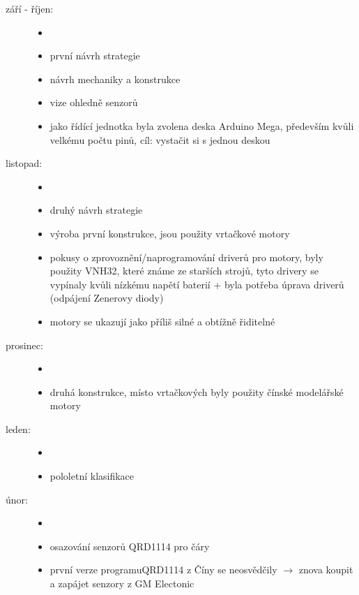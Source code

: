 \begin{description}
	\item[září - říjen:] 
	
	\begin{itemize}
	    \item[]
		\item první návrh strategie
		\item návrh mechaniky a konstrukce
		\item  vize ohledně senzorů
		\item jako řídící jednotka byla zvolena deska Arduino Mega, především kvůli velkému počtu pinů, cíl: vystačit si s jednou deskou  
		
	\end{itemize} 
	
	\item[listopad:] 
	
	\begin{itemize}
		\item[]
		\item druhý návrh strategie
		\item výroba první konstrukce, jsou použity vrtačkové motory
		\item pokusy o zprovoznění/naprogramování driverů pro motory, byly použity VNH32, které známe ze starších strojů, 
		tyto drivery se vypínaly kvůli nízkému napětí baterií + byla potřeba úprava driverů (odpájení Zenerovy diody)  
		\item motory se ukazují jako příliš silné a obtížně řiditelné 
	\end{itemize}
	
	\item[prosinec:]
	\begin{itemize}
		\item[]
		\item druhá konstrukce, místo vrtačkových byly použity čínské modelářské motory
	\end{itemize} 
	
	\item[leden:]
	\begin{itemize}
		\item[]
		\item  pololetní klasifikace
	\end{itemize}  
	
	\item[únor:] 
	\begin{itemize}
		\item[]
		\item osazování senzorů QRD1114 pro čáry
		\item první verze programuQRD1114 z Číny se neosvědčily $\rightarrow$ znova koupit a zapájet senzory z GM Electonic
		

\end{itemize}
\end{description}
